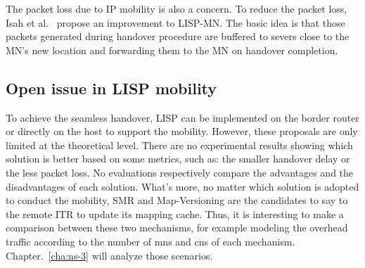 The packet loss due to IP mobility is also a concern. To reduce the packet loss, Isah et al.~\cite{isah2017towards} propose an improvement to LISP-MN. The basic idea is that those packets generated during handover procedure are buffered to severs close to the MN’s new location and forwarding them to the MN on handover completion.


\subsection{Open issue in LISP mobility}
\label{subsec:mobility_missing}
To achieve the seamless handover, LISP can be implemented on the border router or directly on the host to support the mobility. However, these proposals are only limited at the theoretical level. There are no experimental results showing which solution is better based on some metrics, such as: the smaller handover delay or the less packet loss. No evaluations respectively compare the advantages and the disadvantages of each solution. What's more, no matter which solution is adopted to conduct the mobility, SMR and Map-Versioning are the candidates to say to the remote ITR to update its mapping cache. Thus, it is interesting to make a comparison between these two mechanisms, for example modeling the overhead traffic according to the number of \acrshort{mn}s and \acrshort{cn}s of each mechanism. Chapter.~\ref{cha:ns-3} will analyze those scenarios.



